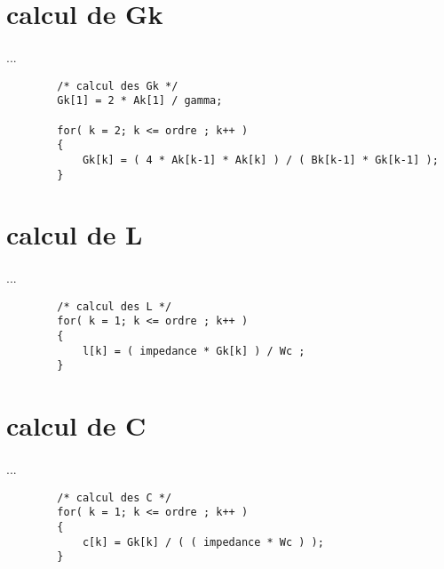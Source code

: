 \documentclass[a4paper,11pt]{article}
\begin{document}
\section{calcul de Gk }
    \paragraph{}
    ...
    \begin{lstlisting}
        /* calcul des Gk */
        Gk[1] = 2 * Ak[1] / gamma;

        for( k = 2; k <= ordre ; k++ )
        {
            Gk[k] = ( 4 * Ak[k-1] * Ak[k] ) / ( Bk[k-1] * Gk[k-1] );
        }
    \end{lstlisting}

\section{calcul de L }
    \paragraph{}
    ...
    \begin{lstlisting}
        /* calcul des L */
        for( k = 1; k <= ordre ; k++ )
        {
            l[k] = ( impedance * Gk[k] ) / Wc ;
        }
    \end{lstlisting}

\section{calcul de C }
    \paragraph{}
    ...
    \begin{lstlisting}
        /* calcul des C */
        for( k = 1; k <= ordre ; k++ )
        {
            c[k] = Gk[k] / ( ( impedance * Wc ) );
        }
    \end{lstlisting}
\end{document}
